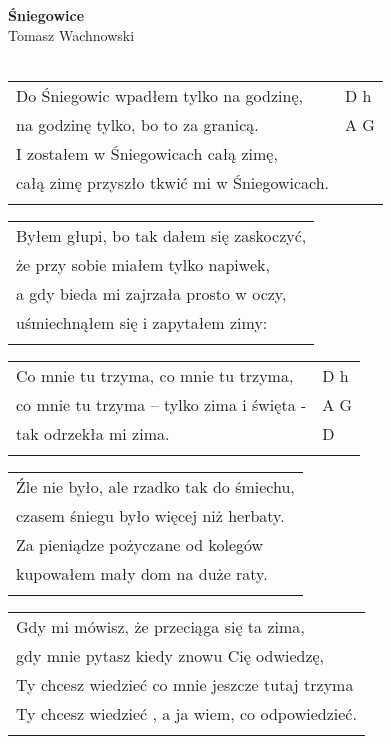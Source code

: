 \documentclass[a5paper]{article}
\begin{document}


\noindent
\fontsize{12pt}{15pt}\selectfont
\textbf{Śniegowice} \\
\fontsize{8pt}{10pt}\selectfont
Tomasz Wachnowski \\ \\
\fontsize{10pt}{12pt}\selectfont
{}
\begin{tabular}{@{}p{8.50cm}p{3cm}@{}}
\noindent
Do Śniegowic wpadłem tylko na godzinę, & D h \\
na godzinę tylko, bo to za granicą. & A G \\
I zostałem w Śniegowicach całą zimę, \\
całą zimę przyszło tkwić mi w Śniegowicach. \\ \\
\end{tabular}

\noindent
\begin{tabular}{@{}p{8.50cm}@{}}
Byłem głupi, bo tak dałem się zaskoczyć, \\
że przy sobie miałem tylko napiwek, \\
a gdy bieda mi zajrzała prosto w oczy, \\
uśmiechnąłem się i zapytałem zimy: \\ \\
\end{tabular}

\noindent
\begin{tabular}{@{}p{7.50cm}p{3cm}@{}}
Co mnie tu trzyma, co mnie tu trzyma, & D h \\
co mnie tu trzyma – tylko zima i święta - & A G \\
tak odrzekła mi zima. & D \\ \\
\end{tabular}

\noindent
\begin{tabular}{@{}p{8.50cm}@{}}
Źle nie było, ale rzadko tak do śmiechu, \\
czasem śniegu było więcej niż herbaty. \\
Za pieniądze pożyczane od kolegów \\
kupowałem mały dom na duże raty. \\ \\
\end{tabular}

\noindent
\begin{tabular}{@{}p{8.50cm}@{}}
Gdy mi mówisz, że przeciąga się ta zima, \\
gdy mnie pytasz kiedy znowu Cię odwiedzę, \\
Ty chcesz wiedzieć co mnie jeszcze tutaj trzyma \\
Ty chcesz wiedzieć , a ja wiem, co odpowiedzieć. \\ \\
\end{tabular}
\end{document}
